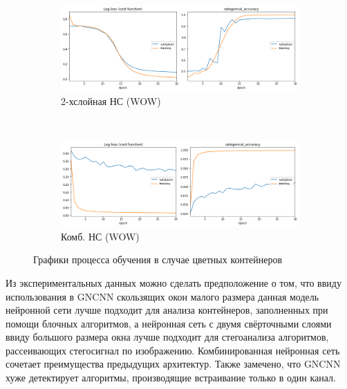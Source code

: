 \begin{figure}[p]
    \centering

    \begin{subfigure}{\textwidth}
        \includegraphics[width=\textwidth]{include/graphics/experimental_plots/color/french_wow}
                                    \caption{2-хслойная НС (WOW)}
    \end{subfigure}
    ~
    \begin{subfigure}{\textwidth}
        \includegraphics[width=\textwidth]{include/graphics/experimental_plots/color/mixed_wow}
                                            \caption{Комб. НС (WOW)}
    \end{subfigure}

    \caption{Графики процесса обучения в случае цветных контейнеров}
    \label{fig:ColorPlotsWOW}
\end{figure}

Из экспериментальных данных можно сделать предположение о том, что ввиду использования в GNCNN скользящих окон малого размера данная модель нейронной сети лучше подходит для анализа контейнеров, заполненных при помощи блочных алгоритмов, а нейронная сеть с двумя свёрточными слоями ввиду большого размера окна лучше подходит для стегоанализа алгоритмов, рассеивающих стегосигнал по изображению. Комбинированная нейронная сеть сочетает преимущества предыдущих архитектур. Также замечено, что GNCNN хуже детектирует алгоритмы, производящие встраивание только в один канал.

\clearpage
